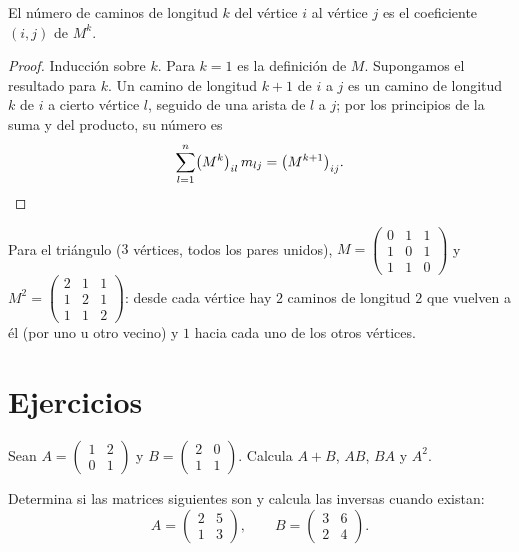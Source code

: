 \begin{theorem}\label{thm:g12:matrix:walks}
El número de caminos de longitud $k$ del vértice $i$ al vértice $j$ es el
coeficiente $(i,j)$ de $M^k$.
\end{theorem}

\begin{proof}
Inducción sobre $k$. Para $k = 1$ es la definición de $M$. Supongamos el
resultado para $k$. Un camino de longitud $k+1$ de $i$ a $j$ es un camino
de longitud $k$ de $i$ a cierto vértice $l$, seguido de una arista de $l$ a
$j$; por los principios de la suma y del producto, su número es
\[
\sum_{l=1}^{n} \bigl(M^k\bigr)_{il}\, m_{lj} = \bigl(M^{k+1}\bigr)_{ij}.
\qedhere
\]
\end{proof}

\begin{example}
Para el  triángulo ($3$ vértices, todos los pares unidos),
$M = \begin{pmatrix} 0&1&1\\ 1&0&1\\ 1&1&0\end{pmatrix}$ y
$M^2 = \begin{pmatrix} 2&1&1\\ 1&2&1\\ 1&1&2\end{pmatrix}$: desde cada
vértice hay $2$ caminos de longitud $2$ que vuelven a él (por uno u otro
vecino) y $1$ hacia cada uno de los otros vértices.
\end{example}

\section{Ejercicios}

\begin{exercise}[$\star$]\label{exo:g12:matrix:1}
Sean $A = \begin{pmatrix} 1 & 2\\ 0 & 1 \end{pmatrix}$ y
$B = \begin{pmatrix} 2 & 0\\ 1 & 1 \end{pmatrix}$. Calcula $A + B$, $AB$,
$BA$ y $A^2$.
\end{exercise}

\begin{exercise}[$\star$]\label{exo:g12:matrix:2}
Determina si las matrices siguientes son  y calcula las inversas
cuando existan:
\[
A = \begin{pmatrix} 2 & 5\\ 1 & 3\end{pmatrix}, \qquad
B = \begin{pmatrix} 3 & 6\\ 2 & 4\end{pmatrix}.
\]
\end{exercise}

